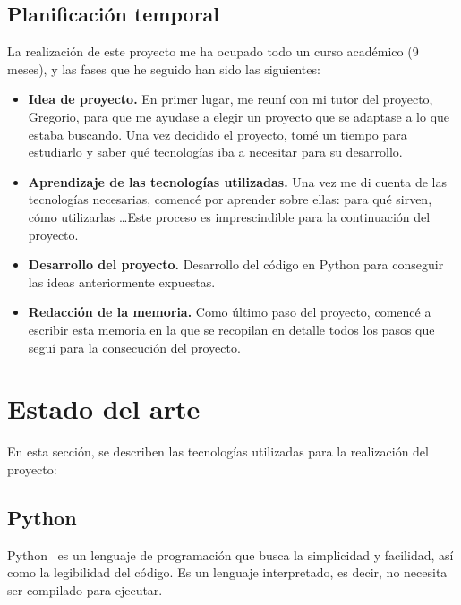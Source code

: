\documentclass[a4paper, 12pt]{book}
\begin{document}
\section{Planificación temporal}
\label{sec:planificacion-temporal}
La realización de este proyecto me ha ocupado todo un curso académico (9 meses), y las fases que he seguido han sido las siguientes:
\begin{itemize}
	\item \textbf{Idea de proyecto.} En primer lugar, me reuní con mi tutor del proyecto, Gregorio, para que me ayudase a elegir un proyecto que se adaptase a lo que estaba buscando. Una vez decidido el proyecto, tomé un tiempo para estudiarlo y saber qué tecnologías iba a necesitar para su desarrollo.
	\item \textbf{Aprendizaje de las tecnologías utilizadas.} Una vez me di cuenta de las tecnologías necesarias, comencé por aprender sobre ellas: para qué sirven, cómo utilizarlas \ldots Este proceso es imprescindible para la continuación del proyecto.
	\item \textbf{Desarrollo del proyecto.} Desarrollo del código en Python para conseguir las ideas anteriormente expuestas.
	\item \textbf{Redacción de la memoria.} Como último paso del proyecto, comencé a escribir esta memoria en la que se recopilan en detalle todos los pasos que seguí para la consecución del proyecto.
\end{itemize}



\cleardoublepage
\chapter{Estado del arte}
\label{chap:estadoarte} %

En esta sección, se describen las tecnologías utilizadas para la realización del proyecto:

\section{Python}
\label{sec:python}
Python~\cite{python:1} es un lenguaje de programación que busca la simplicidad y facilidad, así como la legibilidad del código. Es un lenguaje interpretado, es decir, no necesita ser compilado para ejecutar.\\
\end{document}
